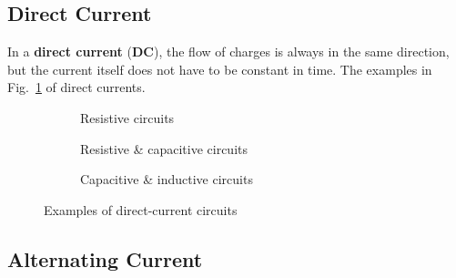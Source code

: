 \subsection{Direct Current}

In a \textbf{direct current} (\textbf{DC}), the flow of charges is always in
the same direction, but the current itself does not have to be constant in
time. The examples in Fig.~\ref{fig:DC-examples} of direct currents.
\begin{figure}[ht]
  \centering
  \begin{subfigure}{.28\textwidth}
    \centering
    \caption{Resistive circuits}
  \end{subfigure}
  \begin{subfigure}{.34\textwidth}
    \centering
    \caption{Resistive \& capacitive circuits}
  \end{subfigure}
  \begin{subfigure}{.34\textwidth}
    \centering
    \caption{Capacitive \& inductive circuits}
  \end{subfigure}
  \caption{Examples of direct-current circuits}
  \label{fig:DC-examples}
\end{figure}



\subsection{Alternating Current}

